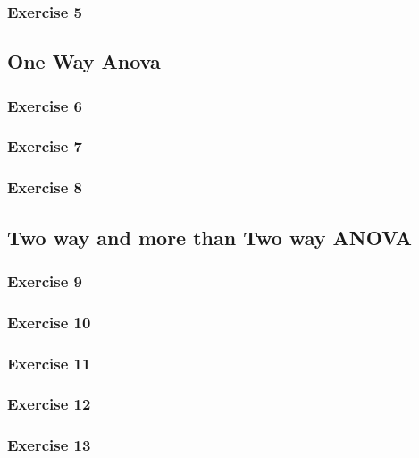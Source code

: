 \documentclass[english,]{article}
\begin{document}
\subsubsection{Exercise 5}\label{exercise-5}

\subsection{One Way Anova}\label{one-way-anova}

\subsubsection{Exercise 6}\label{exercise-6}

\subsubsection{Exercise 7}\label{exercise-7}

\subsubsection{Exercise 8}\label{exercise-8}

\subsection{Two way and more than Two way
ANOVA}\label{two-way-and-more-than-two-way-anova}

\subsubsection{Exercise 9}\label{exercise-9}

\subsubsection{Exercise 10}\label{exercise-10}

\subsubsection{Exercise 11}\label{exercise-11}

\subsubsection{Exercise 12}\label{exercise-12}

\subsubsection{Exercise 13}\label{exercise-13}
\end{document}
